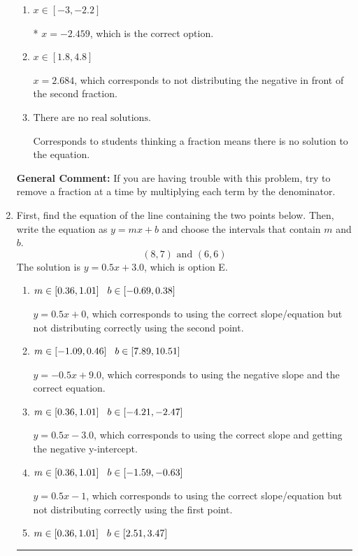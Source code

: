 \documentclass{extbook}[14pt]
\newcommand{\litem}[1]{\item #1

\rule{\textwidth}{0.4pt}}
\begin{document}
\begin{enumerate}
{\begin{enumerate}[label=\Alph*.]
 $x = -4.000$, which corresponds to dividing the coefficients in front of x by the denominator rather than dividing BOTH parts of the numerator by the denominator (or removing the fractions through multiplication).
\item \( x \in [-3, -2.2] \)

* $x = -2.459$, which is the correct option.
\item \( x \in [1.8, 4.8] \)

 $x = 2.684$, which corresponds to not distributing the negative in front of the second fraction.
\item \( \text{There are no real solutions.} \)

Corresponds to students thinking a fraction means there is no solution to the equation.
\end{enumerate}

\textbf{General Comment:} If you are having trouble with this problem, try to remove a fraction at a time by multiplying each term by the denominator.
}
\litem{
First, find the equation of the line containing the two points below. Then, write the equation as $ y=mx+b $ and choose the intervals that contain $m$ and $b$.
\[ (8, 7) \text{ and } (6, 6) \]The solution is \( y = 0.5x + 3.0 \), which is option E.\begin{enumerate}[label=\Alph*.]
\item \( m \in [0.36, 1.01] \hspace*{3mm} b \in [-0.69, 0.38] \)

 $y = 0.5x + 0$, which corresponds to using the correct slope/equation but not distributing correctly using the second point.
\item \( m \in [-1.09, 0.46] \hspace*{3mm} b \in [7.89, 10.51] \)

 $y = -0.5x + 9.0$, which corresponds to using the negative slope and the correct equation.
\item \( m \in [0.36, 1.01] \hspace*{3mm} b \in [-4.21, -2.47] \)

 $y = 0.5x -3.0$, which corresponds to using the correct slope and getting the negative y-intercept.
\item \( m \in [0.36, 1.01] \hspace*{3mm} b \in [-1.59, -0.63] \)

 $y = 0.5x -1$, which corresponds to using the correct slope/equation but not distributing correctly using the first point.
\item \( m \in [0.36, 1.01] \hspace*{3mm} b \in [2.51, 3.47] \)


\end{enumerate}}
\end{enumerate}
\end{document}
